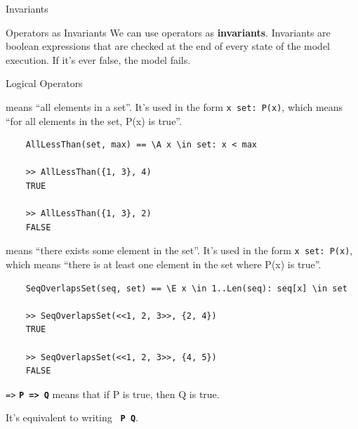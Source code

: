 \documentclass[10pt]{beamer}
\begin{document}
\begin{frame}{Invariants}
  \begin{exampleblock}{Operators as Invariants}
    We can use operators as \textbf{invariants}. Invariants are boolean expressions that are checked at the end of every state of the model execution. If it's ever false, the model fails.
  \end{exampleblock}
\end{frame}


\begin{frame}{Logical Operators}
  
  \begin{exampleblock}{\texttt{\A}}
    \textbf{\texttt{\A}} means ``all elements in a set''. It's used in the form \texttt{\A x \in set: P(x)}, which means ``for all elements in the set, P(x) is true''.
  \end{exampleblock}

  \begin{verbatim}
    AllLessThan(set, max) == \A x \in set: x < max

    >> AllLessThan({1, 3}, 4)
    TRUE

    >> AllLessThan({1, 3}, 2)
    FALSE
  \end{verbatim}

  \framebreak

  \begin{exampleblock}{\texttt{\E}}
    \textbf{\texttt{\E}} means ``there exists some element in the set''. It's used in the form \texttt{\E x \in set: P(x)}, which means ``there is at least one element in the set where P(x) is true''.
  \end{exampleblock}

  \begin{verbatim}
    SeqOverlapsSet(seq, set) == \E x \in 1..Len(seq): seq[x] \in set

    >> SeqOverlapsSet(<<1, 2, 3>>, {2, 4})
    TRUE

    >> SeqOverlapsSet(<<1, 2, 3>>, {4, 5})
    FALSE
  \end{verbatim}
  
  \framebreak

  \begin{exampleblock}{\texttt{=>}}
    \textbf{\texttt{P => Q}} means that if P is true, then Q is true.
  \end{exampleblock}

  It's equivalent to writing \textbf{\texttt{~P \/ Q}}.
  

\end{frame}
\end{document}
